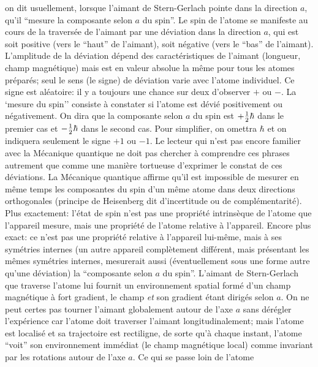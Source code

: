 on dit usuellement, 
lorsque l'aimant de Stern-Gerlach pointe dans la direction $a$, qu'il 
``mesure la composante selon $a$ du spin''. Le spin de l'atome se 
manifeste au cours de la travers\'ee de l'aimant par une d\'eviation dans  
la direction $a$, qui est soit positive (vers le ``haut'' de l'aimant), soit 
n\'egative (vers le ``bas'' de l'aimant). L'amplitude de la d\'eviation  
d\'epend des caract\'eristiques de l'aimant (longueur, champ magn\'etique) 
mais est en valeur absolue la m\^eme pour tous les atomes pr\'epar\'es; 
seul le sens (le signe) de d\'eviation varie avec l'atome individuel. 
Ce signe est al\'eatoire: il y a toujours une chance sur deux d'observer  
$+$ ou $-$.  La `mesure du spin'' consiste \`a constater si 
l'atome est d\'evi\'e positivement ou  n\'egativement. On dira que la 
composante selon $a$ du spin est $+{1  \over 2}\hbar$ dans le premier  
cas et $-{1 \over 2}\hbar$ dans le second cas. Pour simplifier, on  
omettra $\hbar$ et on indiquera seulement le signe $+1$ ou $-1$.  
Le lecteur qui n'est pas encore familier avec la M\'ecanique quantique 
ne doit pas chercher \`a comprendre ces phrases autrement que comme  
une mani\`ere tortueuse d'exprimer le constat de ces d\'eviations.  
\medskip 
La M\'ecanique quantique affirme qu'il est impossible de mesurer en 
m\^eme temps les composantes du spin d'un m\^eme atome dans deux 
directions orthogonales (principe de Heisenberg dit d'incertitude ou de 
compl\'ementarit\'e). Plus exactement:  l'\'etat de spin n'est pas une 
propri\'et\'e intrins\`eque de l'atome que  l'appareil mesure, mais une 
propri\'et\'e de  l'atome relative \`a l'appareil. Encore plus exact: ce
n'est pas une propri\'et\'e relative \`a l'appareil lui-m\^eme, mais \`a ses 
sym\'etries internes (un autre appareil compl\`etement diff\'erent, mais 
pr\'esentant les m\^emes sym\'etries internes, mesurerait aussi 
(\'eventuellement sous une forme autre qu'une d\'eviation) la ``composante 
selon $a$ du spin''. L'aimant de Stern-Gerlach que traverse l'atome lui 
fournit un environnement spatial form\'e d'un champ magn\'etique \`a fort 
gradient, le champ {\it et} son gradient \'etant dirig\'es selon $a$. On ne 
peut certes pas tourner l'aimant globalement autour de l'axe $a$ sans 
d\'er\'egler l'exp\'erience car l'atome doit traverser l'aimant 
longitudinalement; mais l'atome est localis\'e et sa trajectoire est 
rectiligne, de sorte qu'\`a  chaque instant, l'atome ``voit'' son 
environnement imm\'ediat (le champ magn\'etique local) comme invariant 
par les rotations autour de l'axe $a$. Ce qui se passe loin de l'atome 
